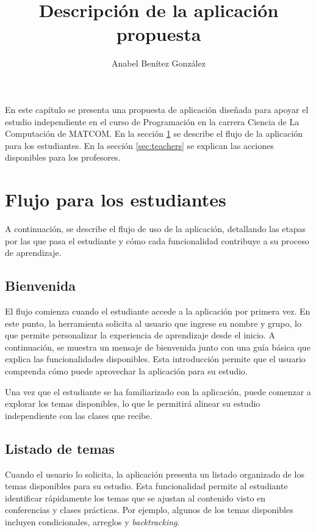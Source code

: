\documentclass{article}
\title{Descripción de la aplicación propuesta}
\author{Anabel Benítez González}
\date{}
\begin{document}
\maketitle

En este capítulo se presenta una propuesta de aplicación diseñada para apoyar el estudio independiente en el curso de Programación en la carrera Ciencia de La Computación de \mbox{MATCOM}. En la sección \ref{sec:students} se describe el flujo de la aplicación para los estudiantes. En la sección \ref{sec:teachers} se explican las acciones disponibles para los profesores.

\section{Flujo para los estudiantes}\label{sec:students}

A continuación, se describe el flujo de uso de la aplicación, detallando las etapas por las que pasa el estudiante y cómo cada funcionalidad contribuye a su proceso de aprendizaje.

\subsection{Bienvenida}

El flujo comienza cuando el estudiante accede a la aplicación por primera vez. En este punto, la herramienta solicita al usuario que ingrese su nombre y grupo, lo que permite personalizar la experiencia de aprendizaje desde el inicio. A continuación, se muestra un mensaje de bienvenida junto con una guía básica que explica las funcionalidades disponibles. Esta introducción permite que el usuario comprenda cómo puede aprovechar la aplicación para su estudio.

Una vez que el estudiante se ha familiarizado con la aplicación, puede comenzar a explorar los temas disponibles, lo que le permitirá alinear su estudio independiente con las clases que recibe.

\subsection{Listado de temas}

Cuando el usuario lo solicita, la aplicación presenta un listado organizado de los temas disponibles para su estudio. Esta funcionalidad permite al estudiante identificar rápidamente los temas que se ajustan al contenido visto en conferencias y clases prácticas. Por ejemplo, algunos de los temas disponibles incluyen condicionales, arreglos y \textit{backtracking}.
\end{document}
